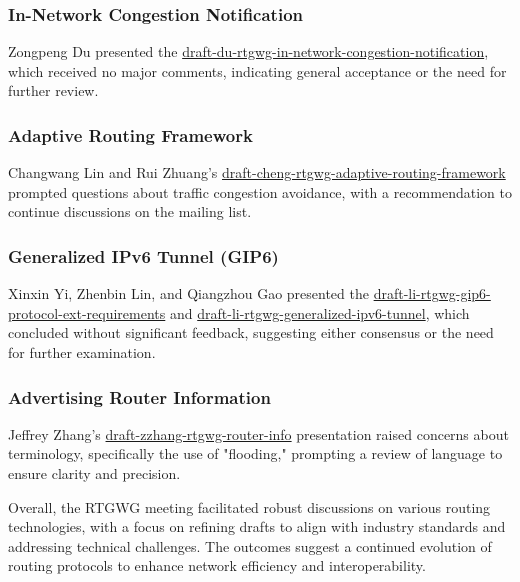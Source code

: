 \documentclass{article}
\begin{document}
\subsubsection{In-Network Congestion Notification}
Zongpeng Du presented the \href{https://datatracker.ietf.org/doc/html/draft-du-rtgwg-in-network-congestion-notification}{draft-du-rtgwg-in-network-congestion-notification}, which received no major comments, indicating general acceptance or the need for further review.

\subsubsection{Adaptive Routing Framework}
Changwang Lin and Rui Zhuang's \href{https://datatracker.ietf.org/doc/html/draft-cheng-rtgwg-adaptive-routing-framework}{draft-cheng-rtgwg-adaptive-routing-framework} prompted questions about traffic congestion avoidance, with a recommendation to continue discussions on the mailing list.

\subsubsection{Generalized IPv6 Tunnel (GIP6)}
Xinxin Yi, Zhenbin Lin, and Qiangzhou Gao presented the \href{https://datatracker.ietf.org/doc/html/draft-li-rtgwg-gip6-protocol-ext-requirements}{draft-li-rtgwg-gip6-protocol-ext-requirements} and \href{https://datatracker.ietf.org/doc/html/draft-li-rtgwg-generalized-ipv6-tunnel/04}{draft-li-rtgwg-generalized-ipv6-tunnel}, which concluded without significant feedback, suggesting either consensus or the need for further examination.

\subsubsection{Advertising Router Information}
Jeffrey Zhang's \href{https://datatracker.ietf.org/doc/html/draft-zzhang-rtgwg-router-info}{draft-zzhang-rtgwg-router-info} presentation raised concerns about terminology, specifically the use of "flooding," prompting a review of language to ensure clarity and precision.

Overall, the RTGWG meeting facilitated robust discussions on various routing technologies, with a focus on refining drafts to align with industry standards and addressing technical challenges. The outcomes suggest a continued evolution of routing protocols to enhance network efficiency and interoperability.
\end{document}

